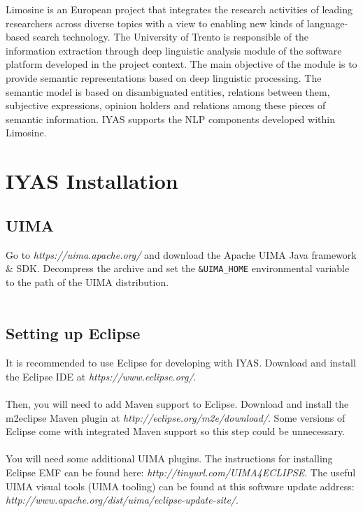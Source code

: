 \documentclass{wileysev}
\begin{document}
Limosine is an European project that integrates the research activities of leading researchers across diverse topics with a view to enabling new kinds of language-based search technology. The University of Trento is responsible of the information extraction through deep linguistic analysis module of the software platform developed in the project context. The main objective of the module is to provide semantic representations based on deep linguistic processing. The semantic model is based on disambiguated entities, relations between them, subjective expressions, opinion holders and relations among these pieces of semantic information. IYAS supports the NLP components developed within Limosine. 

\chapter[IYAS Installation]
{IYAS Installation}

\section[UIMA]{UIMA}

Go to \textit{https://uima.apache.org/} and download the Apache UIMA Java framework \& SDK. Decompress the archive and set the \texttt{\&UIMA\_HOME} environmental variable to the path of the UIMA distribution.
\\\\
\section[Setting up Eclipse]{Setting up Eclipse}
It is recommended to use Eclipse for developing with IYAS. Download and install the Eclipse IDE at \textit{https://www.eclipse.org/}.
\\\\
Then, you will need to add Maven support to Eclipse. Download and install the m2eclipse Maven plugin at \textit{http://eclipse.org/m2e/download/}. Some versions of Eclipse come with integrated Maven support so this step could be unnecessary.
\\\\
You will need some additional UIMA plugins. The instructions for installing Eclipse EMF can be found here: \textit{http://tinyurl.com/UIMA4ECLIPSE}. The useful UIMA visual tools (UIMA tooling) can be found at this software update address:\\ \textit{http://www.apache.org/dist/uima/eclipse-update-site/}.
\end{document}
